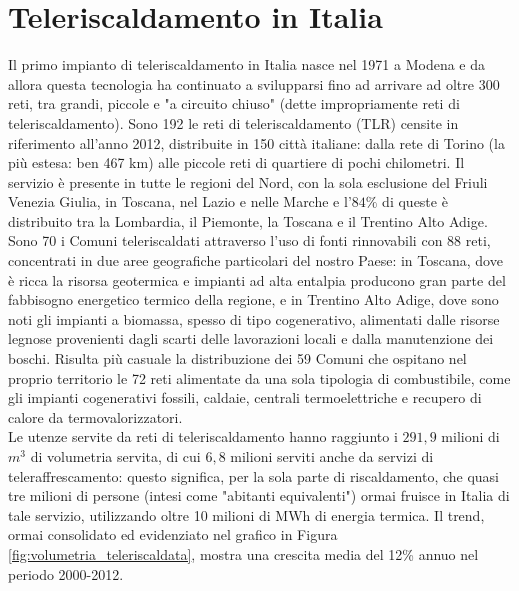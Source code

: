 \documentclass[laurea,oneside,11pt]{USiena_tesiLM3}
\begin{document}
\section{Teleriscaldamento in Italia}
Il primo impianto di teleriscaldamento in Italia nasce nel 1971 a Modena e da allora questa tecnologia ha continuato a svilupparsi fino ad arrivare ad oltre 300 reti, tra grandi, piccole e "a circuito chiuso" (dette impropriamente reti di teleriscaldamento). Sono 192 le reti di teleriscaldamento (TLR) censite in riferimento all'anno 2012, distribuite in 150 città italiane: dalla rete di Torino (la più estesa: ben 467 km) alle piccole reti di quartiere di pochi chilometri.
Il servizio è presente in tutte le regioni del Nord, con la sola esclusione del Friuli Venezia Giulia, in Toscana, nel Lazio e nelle Marche e l'$84\%$ di queste è distribuito tra la Lombardia, il Piemonte, la Toscana e il Trentino Alto Adige.\\

Sono 70 i Comuni teleriscaldati attraverso l'uso di fonti rinnovabili con 88 reti, concentrati in due aree geografiche particolari del nostro Paese: in Toscana, dove è ricca la risorsa geotermica e impianti ad alta entalpia producono gran parte del fabbisogno energetico termico della regione, e in Trentino Alto Adige, dove sono noti gli impianti a biomassa, spesso di tipo cogenerativo, alimentati dalle risorse legnose provenienti dagli scarti delle lavorazioni locali e dalla manutenzione dei boschi.
Risulta più casuale  la distribuzione dei 59 Comuni che ospitano nel proprio territorio le 72 reti alimentate da una sola tipologia di combustibile, come gli impianti cogenerativi fossili, caldaie, centrali termoelettriche e recupero di calore da termovalorizzatori. \\

Le utenze servite da reti di teleriscaldamento hanno raggiunto i $291,9$ milioni di $m^3$ di volumetria servita, di cui $6,8$ milioni serviti anche da servizi di teleraffrescamento: questo significa, per la sola parte di riscaldamento, che quasi tre milioni di persone (intesi come "abitanti equivalenti") ormai fruisce in Italia di tale servizio, utilizzando oltre 10 milioni di MWh di energia termica.
Il trend, ormai consolidato ed evidenziato nel grafico in Figura \ref{fig:volumetria_teleriscaldata}, mostra una crescita media del 12\% annuo nel periodo 2000-2012. 
\end{document}
